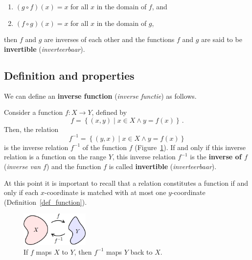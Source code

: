 \begin{enumerate}

\item  $(g \circ f)(x) = x$ for all $x$ in the domain of $f$, and 

\item  $(f \circ g)(x) = x$ for all $x$ in the domain of $g$,

\end{enumerate}

then $f$ and $g$ are inverses of each other and the functions $f$ and $g$ are said to be \textbf{invertible} (\textit{inverteerbaar}).  

\fi


\subsection{Definition and properties}
We can define an \textbf{inverse function} (\textit{inverse functie}) as follows. 
\begin{definition}\label{inversefunction}
Consider a function $f: X\to Y$, defined by
$$
f=\left\{(x,y)\mid x\in X \wedge y=f(x)\right\}\,.
$$
Then, the relation 
$$
f^{-1}=\left\{(y,x) \mid x\in X \wedge  y=f(x)\right\}
$$
is the inverse relation $f^{-1}$ of the function $f$ (Figure~\ref{fig_functions_37}).  If and only if this inverse relation is a function on the range $Y$, this inverse relation $f^{-1}$ is the \textbf{inverse of $f$} (\textit{inverse van $f$})  and the function $f$ is called \textbf{invertible} (\textit{inverteerbaar}). 
\end{definition}
At this point it is important to recall that a relation constitutes a function if and only if each $x$-coordinate is matched with at most one $y$-coordinate (Definition~\ref{def_function}). \ifcourse


\begin{figure}[H]
	\begin{center}
			\includegraphics[width=0.3\textwidth]{fig_functions_37}
	\caption{If $f$ maps $X$ to $Y$, then $f^{-1}$ maps $Y$ back to $X$.}
	\label{fig_functions_37}
	\end{center}
\end{figure}

